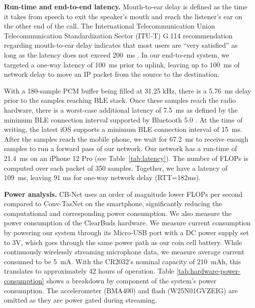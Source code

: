 \documentclass [11pt, proquest] {uwthesis}[2020/02/24]
\begin{document}
{\bf Run-time and end-to-end latency.} Mouth-to-ear delay is defined as the time it takes from speech to exit the speaker's mouth and reach the listener's ear on the other end of the call. The International Telecommunication Union Telecommunication Standardization Sector (ITU-T) G.114 recommendation regarding mouth-to-ear delay indicates that most users are ``very satisfied'' as long as the latency does not exceed 200~ms \cite{g.114}. In our end-to-end system, we targeted a one-way latency of 100~ms prior to uplink, leaving up to 100~ms of network delay to move an IP packet from the source to the destination.

With a 180-sample PCM buffer being filled at 31.25 kHz, there is a 5.76~ms delay prior to the samples reaching BLE stack. Once these samples reach the radio hardware, there is a worst-case additional latency of 7.5~ms as defined by the minimum BLE connection interval supported by Bluetooth 5.0 \cite{bt5}. At the time of writing, the latest iOS supports a minimum BLE connection interval of 15~ms. After the samples reach the mobile phone, we wait for 67.2~ms to receive enough samples to run a forward pass of our network. Our network has a run-time of 21.4~ms on an iPhone 12 Pro (see Table~\ref{tab:latency}). The number of FLOPs is  computed over each packet of 350 samples. Together, we have a  latency of 109~ms, leaving 91 ms for  one-way network delay  (RTT=182ms).



{\bf Power analysis.} {CB-Net uses   an order of magnitude lower FLOPs per second compared to Conv-TasNet on the smartphone, significantly reducing the computational and corresponding power consumption. } We also  measure  the power consumption of the ClearBuds hardware. We measure current consumption by powering our system through its Micro-USB port with a DC power supply set to 3V, which goes through the same power path as our coin cell battery.
While continuously wirelessly streaming microphone data, we measure average current consumed to be 5~mA. With the CR2032's nominal capacity of 210~mAh, this translates to approximately 42 hours of operation. Table \ref{tab:hardware-power-consumption} shows a breakdown by component of the system's power consumption. The accelerometer (BMA400) and flash (W25N01GVZEIG) are omitted as they are power gated during  streaming. 

\end{document}
